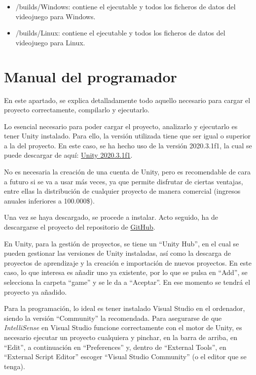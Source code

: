 \begin{itemize}
\tightlist
	\item /builds/Windows: contiene el ejecutable y todos los ficheros de datos del videojuego para Windows.
	\item /builds/Linux: contiene el ejecutable y todos los ficheros de datos del videojuego para Linux.
\end{itemize}

\section{Manual del programador}

En este apartado, se explica detalladamente todo aquello necesario para cargar el proyecto correctamente, compilarlo y ejecutarlo.

Lo esencial necesario para poder cargar el proyecto, analizarlo y ejecutarlo es tener Unity instalado. Para ello, la versión utilizada tiene que ser igual o superior a la del proyecto. En este caso, se ha hecho uso de la versión 2020.3.1f1, la cual se puede descargar de aquí: \href{https://unity3d.com/es/get-unity/download?thank-you=update&download_nid=64582&os=Win}{Unity 2020.3.1f1}.

No es necesaria la creación de una cuenta de Unity, pero es recomendable de cara a futuro si se va a usar más veces, ya que permite disfrutar de ciertas ventajas, entre ellas la distribución de cualquier proyecto de manera comercial (ingresos anuales inferiores a 100.000\$).

Una vez se haya descargado, se procede a instalar. Acto seguido, ha de descargarse el proyecto del repositorio de \href{https://github.com/Kencho/fastastic-roads}{GitHub}.

En Unity, para la gestión de proyectos, se tiene un ``Unity Hub'', en el cual se pueden gestionar las versiones de Unity instaladas, así como la descarga de proyectos de aprendizaje y la creación e importación de nuevos proyectos. En este caso, lo que interesa es añadir uno ya existente, por lo que se pulsa en ``Add'', se selecciona la carpeta ``game'' y se le da a ``Aceptar''. En ese momento se tendrá el proyecto ya añadido.

Para la programación, lo ideal es tener instalado Visual Studio en el ordenador, siendo la versión ``Community'' la recomendada. Para asegurarse de que \textit{IntelliSense} en Visual Studio funcione correctamente con el motor de Unity, es necesario ejecutar un proyecto cualquiera y pinchar, en la barra de arriba, en ``Edit'', a continuación en ``Preferences'' y, dentro de ``External Tools'', en ``External Script Editor'' escoger ``Visual Studio Community'' (o el editor que se tenga).

